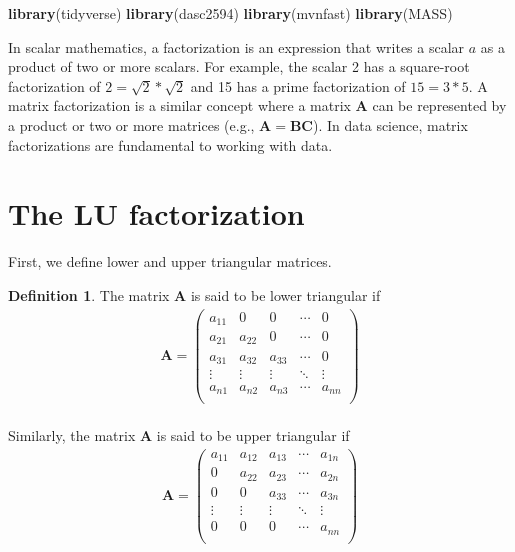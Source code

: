 \documentclass[
]{book}
\newenvironment{Shaded}{\begin{snugshade}}{\end{snugshade}}
\newcommand{\KeywordTok}[1]{\textcolor[rgb]{0.13,0.29,0.53}{\textbf{#1}}}
\newcommand{\NormalTok}[1]{#1}
\theoremstyle{definition}
\newtheorem{definition}{Definition}[chapter]
\theoremstyle{definition}
\theoremstyle{definition}
\theoremstyle{remark}
\begin{document}
\begin{Shaded}
\begin{Highlighting}[]
\KeywordTok{library}\NormalTok{(tidyverse)}
\KeywordTok{library}\NormalTok{(dasc2594)}
\KeywordTok{library}\NormalTok{(mvnfast)}
\KeywordTok{library}\NormalTok{(MASS)}
\end{Highlighting}
\end{Shaded}

In scalar mathematics, a factorization is an expression that writes a scalar \(a\) as a product of two or more scalars. For example, the scalar 2 has a square-root factorization of \(2 =\sqrt{2} * \sqrt{2}\) and 15 has a prime factorization of \(15 = 3 * 5\). A matrix factorization is a similar concept where a matrix \(\mathbf{A}\) can be represented by a product or two or more matrices (e.g., \(\mathbf{A} = \mathbf{B} \mathbf{C}\)). In data science, matrix factorizations are fundamental to working with data.

\hypertarget{the-lu-factorization}{%
\section{The LU factorization}\label{the-lu-factorization}}

First, we define lower and upper triangular matrices.

\begin{definition}
\protect\hypertarget{def:unnamed-chunk-156}{}{\label{def:unnamed-chunk-156} }The matrix \(\mathbf{A}\) is said to be lower triangular if
\[
\begin{aligned}
\mathbf{A} = \begin{pmatrix} 
a_{11} & 0 & 0 & \cdots & 0 \\
a_{21} & a_{22} & 0 & \cdots & 0 \\
a_{31} & a_{32} & a_{33} & \cdots & 0 \\
\vdots & \vdots & \vdots & \ddots & \vdots \\
a_{n1} & a_{n2} & a_{n3} & \cdots & a_{nn} \\
\end{pmatrix}
\end{aligned}
\]\\
Similarly, the matrix \(\mathbf{A}\) is said to be upper triangular if
\[
\begin{aligned}
\mathbf{A} = \begin{pmatrix} 
a_{11} & a_{12} & a_{13} & \cdots & a_{1n} \\
0 & a_{22} & a_{23} & \cdots & a_{2n} \\
0 & 0 & a_{33} & \cdots & a_{3n} \\
\vdots & \vdots & \vdots & \ddots & \vdots \\
0 & 0 & 0 & \cdots & a_{nn} \\
\end{pmatrix}
\end{aligned}
\]\\
\end{definition}
\end{document}
